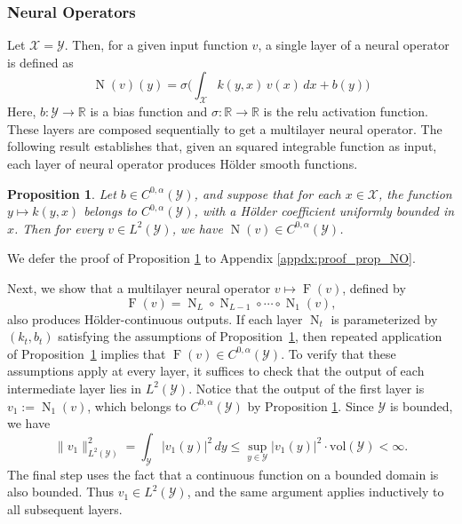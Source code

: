 \documentclass[11pt]{article}
\theoremstyle{plain}
\newtheorem{proposition}{Proposition}
\newcommand{\Xcal}{\mathcal{X}}
\newcommand{\Ycal}{\mathcal{Y}}
\begin{document}
\subsubsection{Neural Operators}

Let $\Xcal = \Ycal$. Then, for a given input function $v$, a single layer of a neural operator is defined as 
\[ \operatorname{N}(v)(y) = \sigma \Big(\int_{\mathcal{X}} k(y, x)\, v(x) \,dx + b(y) \Big) \]
Here,  $b: \mathcal{Y} \to \mathbb{R}$ is a bias function and $\sigma: \mathbb{R} \to \mathbb{R}$ is the relu activation function. These layers are composed sequentially to get a multilayer neural operator.  The following result establishes that, given an squared integrable function as input, each layer of neural operator produces H{\" o}lder smooth functions.

\begin{proposition}\label{prop:holder-NO}
Let $ b \in C^{0,\alpha}(\Ycal) $, and suppose that for each $ x \in \Xcal $, the function $ y \mapsto k(y, x) $ belongs to $ C^{0,\alpha}(\Ycal) $, with a Hölder coefficient uniformly bounded in $ x $. Then for every $ v \in L^2(\Ycal) $, we have $ \operatorname{N}(v) \in C^{0,\alpha}(\Ycal) $.

\end{proposition}
\noindent We defer the proof of Proposition \ref{prop:holder-NO} to Appendix \ref{appdx:proof_prop_NO}.


Next, we show that a multilayer neural operator $v \mapsto \operatorname{F}(v)$, defined by
\[
\operatorname{F}(v)
=
\operatorname{N}_L \circ \operatorname{N}_{L-1} \circ \cdots \circ \operatorname{N}_1(v),
\]
also produces H{\" o}lder-continuous outputs. If each layer $\operatorname{N}_t$ is parameterized by
$(k_t, b_t)$ satisfying the assumptions of Proposition~\ref{prop:holder-NO}, then repeated
application of Proposition~\ref{prop:holder-NO} implies that
$\operatorname{F}(v) \in C^{0,\alpha}(\Ycal)$. To verify that these assumptions apply at every layer, it suffices to check that the output of each
intermediate layer lies in $L^2(\Ycal)$. Notice that the output of the first layer
is $v_1 := \operatorname{N}_1(v)$, which belongs to $C^{0,\alpha}(\Ycal)$ by
Proposition \ref{prop:holder-NO}. Since $\Ycal$ is bounded, we have
\[
\|v_1\|_{L^2(\Ycal)}^2
=
\int_{\Ycal} |v_1(y)|^2\, dy
\le
\sup_{y \in \Ycal} |v_1(y)|^2 \cdot \mathrm{vol}(\Ycal)
<
\infty.
\]
The final step uses the fact that a continuous function on a bounded domain is also bounded. Thus $v_1 \in L^2(\Ycal)$, and the same argument applies inductively to all subsequent layers.
\end{document}
